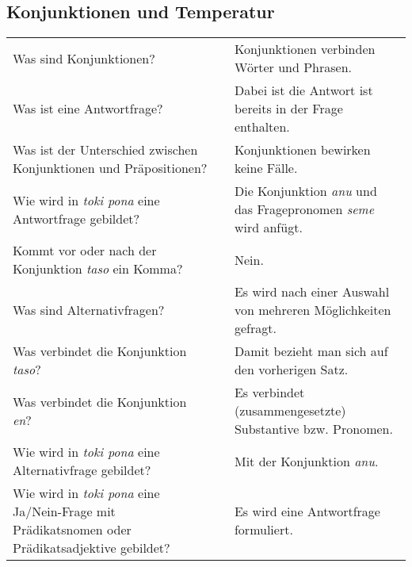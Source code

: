 \newpage
%
\subsection*{Konjunktionen und Temperatur} 
\label{'conjunctions_temperature'}

\begin{supertabular}{p{5,5cm}|ll}
Was sind Konjunktionen? && Konjunktionen verbinden Wörter und Phrasen. \\ %
Was ist eine Antwortfrage? && Dabei ist die Antwort ist bereits in der Frage enthalten. \\ %
Was ist der Unterschied zwischen Konjunktionen und Präpositionen? && Konjunktionen bewirken keine Fälle. \\ %
Wie wird in \textit{toki pona} eine Antwortfrage gebildet? && Die Konjunktion \textit{anu} und das Fragepronomen \textit{seme} wird anfügt. \\ %
Kommt vor oder nach der Konjunktion \textit{taso} ein Komma? && Nein. \\ %
Was sind Alternativfragen? && Es wird nach einer Auswahl von mehreren Möglichkeiten gefragt.  \\ %
Was verbindet die Konjunktion \textit{taso}? && Damit bezieht man sich auf den vorherigen Satz.  \\ %
Was verbindet die Konjunktion \textit{en}? && Es verbindet (zusammengesetzte) Substantive bzw. Pronomen. \\ %
Wie wird in \textit{toki pona} eine Alternativfrage gebildet? && Mit der Konjunktion \textit{anu}. \\ %
Wie wird in \textit{toki pona} eine Ja/Nein-Frage mit Prädikatsnomen oder Prädikatsadjektive gebildet? && Es wird eine Antwortfrage formuliert. \\ %
\end{supertabular}

